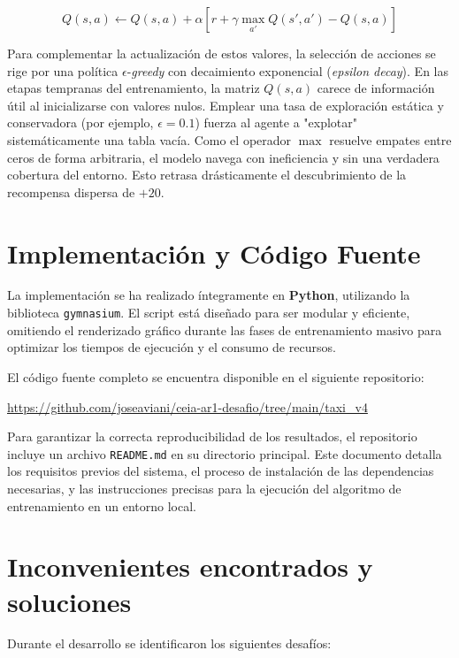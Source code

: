 \documentclass[11pt,a4paper]{article}
\begin{document}
\[ Q(s, a) \leftarrow Q(s, a) + \alpha \left[ r + \gamma \max_{a'} Q(s', a') - Q(s, a) \right] \]

Para complementar la actualización de estos valores, la selección de acciones se rige por una política $\epsilon$-\textit{greedy} con decaimiento exponencial (\textit{epsilon decay}). En las etapas tempranas del entrenamiento, la matriz $Q(s,a)$ carece de información útil al inicializarse con valores nulos. Emplear una tasa de exploración estática y conservadora (por ejemplo, $\epsilon = 0.1$) fuerza al agente a "explotar" sistemáticamente una tabla vacía. Como el operador $\max$ resuelve empates entre ceros de forma arbitraria, el modelo navega con ineficiencia y sin una verdadera cobertura del entorno. Esto retrasa drásticamente el descubrimiento de la recompensa dispersa de $+20$.

\section{Implementación y Código Fuente}

La implementación se ha realizado íntegramente en \textbf{Python}, utilizando la biblioteca \texttt{gymnasium}. El script está diseñado para ser modular y eficiente, omitiendo el renderizado gráfico durante las fases de entrenamiento masivo para optimizar los tiempos de ejecución y el consumo de recursos.

El código fuente completo se encuentra disponible en el siguiente repositorio:

\begin{center}
    \url{https://github.com/joseaviani/ceia-ar1-desafio/tree/main/taxi_v4}
\end{center}

Para garantizar la correcta reproducibilidad de los resultados, el repositorio incluye un archivo \texttt{README.md} en su directorio principal. Este documento detalla los requisitos previos del sistema, el proceso de instalación de las dependencias necesarias, y las instrucciones precisas para la ejecución del algoritmo de entrenamiento en un entorno local.

\section{Inconvenientes encontrados y soluciones}

Durante el desarrollo se identificaron los siguientes desafíos:
\end{document}
